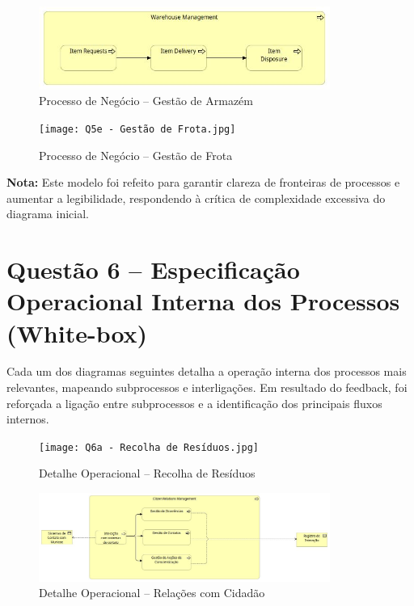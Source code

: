 \documentclass[12pt,a4paper,final]{article}
\begin{document}
    \begin{figure}[H]
        \centering
        \includegraphics[width=0.85\textwidth]{Q5d - Gestão de Armazém.jpg}
        \caption{Processo de Negócio – Gestão de Armazém}
        \label{fig:q5-armazem}
    \end{figure}

    \begin{figure}[H]
        \centering
        \texttt{[image: Q5e - Gestão de Frota.jpg]}
        \caption{Processo de Negócio – Gestão de Frota}
        \label{fig:q5-frota}
    \end{figure}

    \textbf{Nota:} Este modelo foi refeito para garantir clareza de fronteiras de processos e aumentar a legibilidade, respondendo à crítica de complexidade excessiva do diagrama inicial.


    \section*{Questão 6 – Especificação Operacional Interna dos Processos (White-box)}

    Cada um dos diagramas seguintes detalha a operação interna dos processos mais relevantes, mapeando subprocessos e interligações. Em resultado do feedback, foi reforçada a ligação entre subprocessos e a identificação dos principais fluxos internos.

    \begin{figure}[H]
        \centering
        \texttt{[image: Q6a - Recolha de Resíduos.jpg]}
        \caption{Detalhe Operacional – Recolha de Resíduos}
        \label{fig:q6-residuos}
    \end{figure}

    \begin{figure}[H]
        \centering
        \includegraphics[width=0.85\textwidth]{Q6b - Relações com Cidadão.jpg}
        \caption{Detalhe Operacional – Relações com Cidadão}
        \label{fig:q6-cidadao}
    \end{figure}
\end{document}
